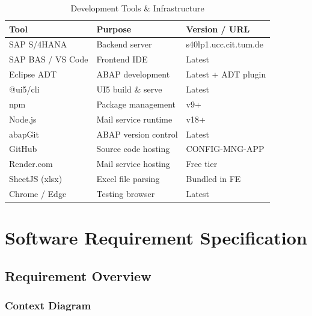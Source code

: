 \documentclass[12pt,a4paper]{report}
\begin{document}
\begin{table}[H]
\centering\small
\begin{tabularx}{\textwidth}{|l|X|l|}
  \hline
  \rowcolor{tableheadpeach}
  \textbf{Tool} & \textbf{Purpose} & \textbf{Version / URL} \\ \hline
  SAP S/4HANA           & Backend server              & s40lp1.ucc.cit.tum.de \\ \hline
  SAP BAS / VS Code     & Frontend IDE                & Latest \\ \hline
  Eclipse ADT           & ABAP development            & Latest + ADT plugin \\ \hline
  @ui5/cli              & UI5 build \& serve          & Latest \\ \hline
  npm                   & Package management          & v9+ \\ \hline
  Node.js               & Mail service runtime        & v18+ \\ \hline
  abapGit               & ABAP version control        & Latest \\ \hline
  GitHub                & Source code hosting          & CONFIG-MNG-APP \\ \hline
  Render.com            & Mail service hosting        & Free tier \\ \hline
  SheetJS (xlsx)        & Excel file parsing          & Bundled in FE \\ \hline
  Chrome / Edge         & Testing browser             & Latest \\ \hline
\end{tabularx}
\caption{Development Tools \& Infrastructure}
\label{tab:tools}
\end{table}




\clearpage
\chapter{Software Requirement Specification}

\section{Requirement Overview}

\subsection{Context Diagram}
\end{document}
